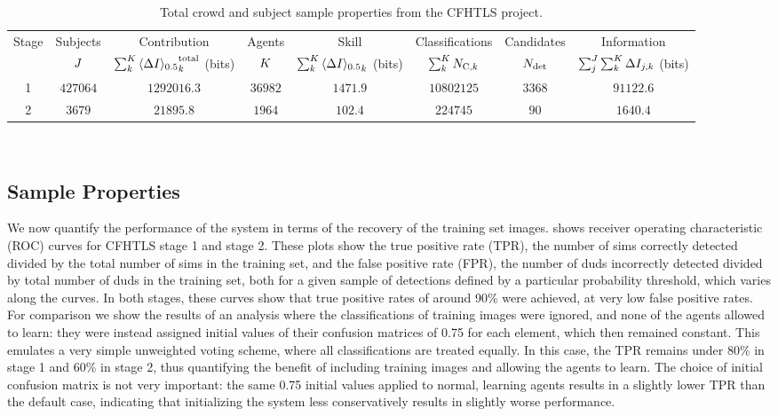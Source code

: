 \documentclass[useAMS,usenatbib,a4paper]{mn2e}
\begin{document}
\begin{table}
\begin{center}
\caption{Total crowd and subject sample properties from the CFHTLS project.}
\label{tab:crowd:contributions}
\begin{tabular}{cccccccc}
  \hline
  \hline {Stage} & Subjects & Contribution                          & Agents & Skill      & Classifications          & Candidates & Information \\
                 & $J$    & $\sum_k^{K} {\langle \Delta I \rangle_{0.5}}^{\rm total}_k$ (bits) & $K$  & $\sum_k^{K} {\langle \Delta I \rangle_{0.5}}_k$ (bits) & $\sum_k^{K} N_{{\rm C},k}$ & $N_{\rm det}$  & $\sum_j^{J}\sum_k^{K} \Delta I_{j,k}$ (bits) \\
  \hline 
            1    & $427064$ & $1292016.3$ & $36982$ & $1471.9$ & $10802125$ & $3368$ & $91122.6$ \\
            2    & $3679$   &   $21895.8$ &  $1964$ &  $102.4$ &   $224745$ &   $90$ &  $1640.4$ \\
  \hline \hline
\end{tabular}
\medskip\\
\end{center}
\end{table}


\subsection{Sample Properties}
\label{sec:results:sample}

We now quantify the performance of the \sw system in terms of the recovery of
the training set images.  shows receiver
operating characteristic (ROC) curves for CFHTLS stage 1 and stage 2. These
plots show the true positive rate (TPR), the number of sims correctly detected
divided by the total number of sims in the training set, and the false
positive rate (FPR), the number of duds incorrectly detected  divided by total
number of duds in the training set, both for a given sample of detections defined by
a particular probability threshold, which varies along the curves.  In both
stages, these curves show that true positive rates of  around 90\% were
achieved, at very low false positive rates. For comparison we show the results
of an analysis where the classifications of  training images were ignored, and
none of the agents allowed to learn: they were instead assigned initial values
of their confusion matrices of 0.75 for each element, which then remained
constant. This emulates a very simple unweighted voting scheme, where all
classifications are treated equally. In this case, the TPR remains under 80\%
in stage 1 and 60\% in stage 2, thus quantifying 
the benefit of including training
images and allowing the agents to learn. The choice of initial confusion
matrix is not very important: the same 0.75 initial values applied to normal,
learning agents results in a slightly lower TPR than the default case,
indicating that initializing the system less conservatively results in
slightly worse performance.
\end{document}

